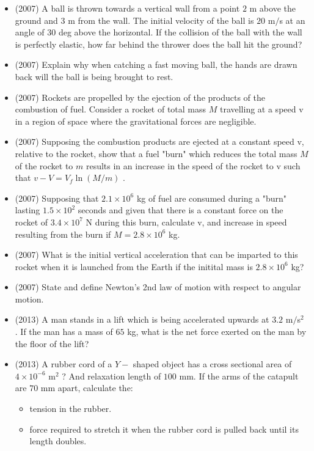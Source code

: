 \documentclass{article}
\begin{document}
\begin{itemize}
\item (2007)  A ball is thrown towards a vertical wall from a point $ 2$ m above the ground and $ 3$ m from the wall.  The initial velocity of the ball is $ 20$ m$/$s at an angle of $ 30$ deg above the horizontal.  If the collision of the ball with the wall is perfectly elastic, how far behind the thrower does the ball hit the ground?
\item (2007)  Explain why when catching a fast moving ball, the hands are drawn back will the ball is being brought to rest.
\item (2007)  Rockets are propelled by the ejection of the products of the combustion of fuel.  Consider a rocket of total mass $ M$ travelling at a speed v in a region of space where the gravitational forces are negligible.  
\item (2007)  Supposing the combustion products are ejected at a constant speed v, relative to the rocket, show that a fuel "burn" which reduces the total mass $ M$ of the rocket to $ m$ results in an increase in the speed of the rocket to v such that $ v-V=V_{f} \ln (M/m)$ .
\item (2007)  Supposing that $ 2.1\times10^{6}$ kg of fuel are consumed during a "burn" lasting $ 1.5\times10^{2}$ seconds and given that there is a constant force on the rocket of $ 3.4\times 10^{7}$ N during this burn, calculate v, and increase in speed resulting from the burn if $ M=2.8\times10^{6}$ kg.  
\item (2007)  What is the initial vertical acceleration that can be imparted to this rocket when it is launched from the Earth if the initital mass is $ 2.8\times 10^{6}$ kg?
\item (2007)  State and define Newton’s 2nd law of motion with respect to angular motion. 
\item (2013)  A man stands in a lift which is being accelerated upwards at $ 3.2$ m$/$s$ ^{2}$ . If the man has a mass of $ 65$ kg, what is the net force exerted on the man by the floor of the lift?
\item (2013)  A rubber cord of a $ Y-$ shaped object has a cross sectional area of $ 4 \times 10^{-6}$ m$ ^{2}$ ? And relaxation length of $ 100$ mm. If the arms of the catapult are $ 70$ mm apart, calculate the: 
 \begin{itemize}
\item tension in the rubber. 
\item force required to stretch it when the rubber cord is pulled back until its length doubles. 
\end{itemize}

\end{itemize}
\end{document}
